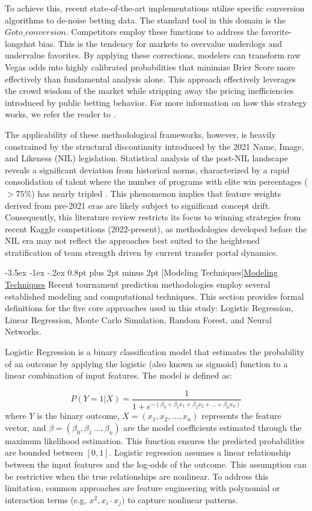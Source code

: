 \documentclass[12pt,leqno]{article}\usepackage[pdftex]{graphicx}\usepackage[usenames,dvipsnames]{xcolor}
\makeatletter
\renewcommand\subsection{\@startsection {subsection}{1}{\z@}%
{-3.5ex \@plus -1ex \@minus -.2ex}%
{0.8pt plus 2pt minus 2pt}%
{\normalfont}}
\newcommand{\usubsection}[1]{\subsection[#1]{\centering\normalfont\underline{#1}}}%
\theoremstyle{remark}
\makeatother
\begin{document}
To achieve this, recent state-of-the-art implementations utilize specific conversion algorithms to de-noise betting data. The standard tool in this domain is the $\textit{Goto\_conversion}$. Competitors employ these functions to address the favorite-longshot bias. This is the tendency for markets to overvalue underdogs and undervalue favorites. By applying these corrections, modelers can transform raw Vegas odds into highly calibrated probabilities that minimize Brier Score more effectively than fundamental analysis alone. This approach effectively leverages the crowd wisdom of the market while stripping away the pricing inefficiencies introduced by public betting behavior. For more information on how this strategy works, we refer the reader to \cite{goto}.

The applicability of these methodological frameworks, however, is heavily constrained by the structural discontinuity introduced by the 2021 Name, Image, and Likeness (NIL) legislation. Statistical analysis of the post-NIL landscape reveals a significant deviation from historical norms, characterized by a rapid consolidation of talent where the number of programs with elite win percentages (
$>75\%$) has nearly tripled \cite{CBS}. This phenomenon implies that feature weights derived from pre-2021 eras are likely subject to significant concept drift. Consequently,
this literature review restricts its focus to winning strategies from recent Kaggle competitions (2022-present), as methodologies developed before the NIL era may not reflect the approaches best suited to the heightened stratification of team strength driven by current transfer portal dynamics.
 
\newpage
\usubsection{Modeling Techniques}
Recent tournament prediction methodologies employ several established modeling and computational techniques. This section provides formal definitions for the five core approaches used in this study: Logistic Regression, Linear Regression, Monte Carlo Simulation, Random Forest, and Neural Networks.

Logistic Regression is a binary classification model that estimates the probability of an outcome by applying the logistic (also known as sigmoid) function to a linear combination of input features. The model is defined as:

\begin{equation}
P(Y=1|X) = \frac{1}{1 + e^{-(\beta_0 + \beta_1 x_1 + \beta_2 x_2 + ... + \beta_n x_n)}}
\end{equation}
where $Y$ is the binary outcome, $X = (x_1,x_2,\ldots,x_n)$ represents the feature vector, and $\beta = (\beta_0,\beta_1\, \ldots, \beta_n)$ are the model coefficients estimated through the maximum likelihood estimation. This function ensures the predicted probabilities are bounded between $[0,1]$. Logistic regression assumes a linear relationship between the input features and the log-odds of the outcome. This assumption can be restrictive when the true relationships are nonlinear. To address this limitation, common approaches are feature engineering with polynomial or interaction terms (e.g, $x^2, x_i \cdot x_j)$ to capture nonlinear patterns. 
\end{document}
